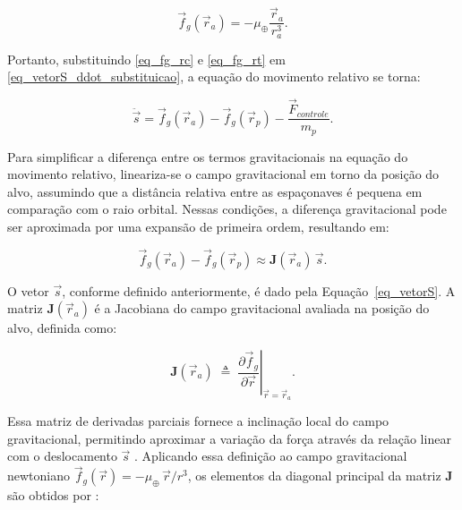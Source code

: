 \begin{equation}
\label{eq_fg_rt}
\vec f_g(\vec r_a) = -\mu_\oplus \frac{\vec r_a}{r_a^3}.
\end{equation}

Portanto, substituindo \eqref{eq_fg_rc} e \eqref{eq_fg_rt} em \eqref{eq_vetorS_ddot_substituicao}, a equação do movimento relativo se torna:

\begin{equation}
\label{eq_fg_rc_fg_rt}
\ddot{\vec s}
=
\vec f_g(\vec r_a) - \vec f_g(\vec r_p) - \frac{\vec F_{controle}}{m_p}.
\end{equation}


Para simplificar a diferença entre os termos gravitacionais na equação do movimento relativo, lineariza-se o campo gravitacional em torno da posição do alvo, assumindo que a distância relativa entre as espaçonaves é pequena em comparação com o raio orbital. Nessas condições, a diferença gravitacional pode ser aproximada por uma expansão de primeira ordem, resultando em:

\begin{equation}
\label{eq_linearizandoJacobiana}
\vec f_g(\vec r_{a}) - \vec f_g(\vec r_{p}) \approx \mathbf{J}(\vec r_{a})\,\vec s.
\end{equation}

O vetor $\vec s$, conforme definido anteriormente, é dado pela Equação~\ref{eq_vetorS}.
A matriz $\mathbf{J}(\vec r_a)$ é a Jacobiana do campo gravitacional avaliada na posição do alvo, definida como:

\begin{equation}
\mathbf{J}(\vec r_a) \;\triangleq\; \left.\frac{\partial \vec f_g}{\partial \vec r}\right|_{\vec r=\vec r_a}.
\end{equation}

Essa matriz de derivadas parciais fornece a inclinação local do campo gravitacional, permitindo aproximar a variação da força através da relação linear com o deslocamento $\vec{s}$ \cite{khalil2002nonlinear}.
Aplicando essa definição ao campo gravitacional newtoniano $\vec f_g(\vec r)=-\mu_\oplus\,\vec r/r^{3}$, os elementos da diagonal principal da matriz $\mathbf{J}$ são obtidos por \cite{fehse2003}:

